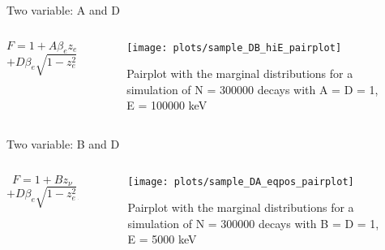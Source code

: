 \documentclass{beamer}
\begin{document}
\begin{frame}{Two variable: A and D}
	\begin{columns}
		\begin{column}{0.4\textwidth}
			$$F = 1 + A\beta_ez_e$$$$+ D\beta_e\sqrt{1-z^2_e}\sqrt{1-z^2_\nu}\sin \phi$$

		\end{column}
		
		\begin{column}{0.6\textwidth}
			\begin{figure}
				\centering
				\texttt{[image: plots/sample\_DB\_hiE\_pairplot]}
				\caption{Pairplot with the marginal distributions for a simulation of N = 300000 decays with A = D = 1, E = 100000 keV}
			\end{figure}
		\end{column}
	\end{columns}
\end{frame}

\begin{frame}{Two variable: B and D}
	\begin{columns}
		\begin{column}{0.4\textwidth}
			$$F = 1  + Bz_\nu$$$$+ D\beta_e\sqrt{1-z^2_e}\sqrt{1-z^2_\nu}\sin \phi$$
			
		\end{column}
		\begin{column}{0.6\textwidth}
			\begin{figure}
				\centering
				\texttt{[image: plots/sample\_DA\_eqpos\_pairplot]}
				\caption{Pairplot with the marginal distributions for a simulation of N = 300000 decays with B = D = 1, E = 5000 keV}
			\end{figure}
		\end{column}
	\end{columns}
\end{frame}
\end{document}
